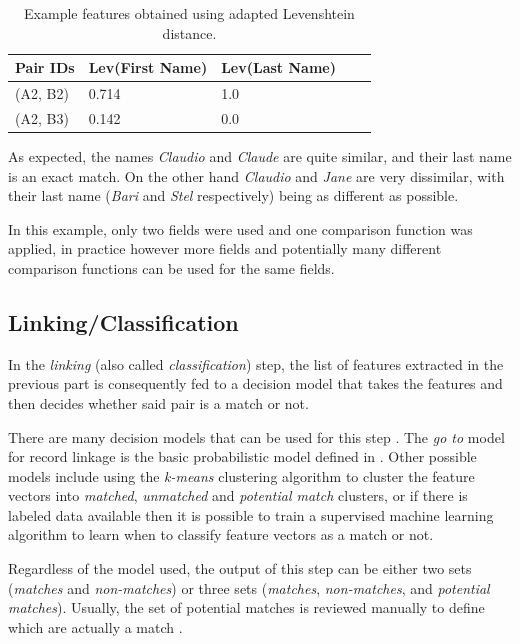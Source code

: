 \documentclass[epsfig,a4paper,11pt,titlepage,twoside,openany]{book}
\begin{document}
\begin{table}[H]
  \centering
  \begin{tabular}{l|l|l|l|l}
    Pair IDs & Lev(First Name) & Lev(Last Name) \\ \hline
    (A2, B2) & 0.714           & 1.0            \\
    (A2, B3) & 0.142           & 0.0           
  \end{tabular}
  \caption{Example features obtained using adapted Levenshtein distance.}
  \label{tab:ex-feature-levens}
\end{table}

As expected, the names \textit{Claudio} and \textit{Claude} are quite similar,
and their last name is an exact match. On the other hand \textit{Claudio} and
\textit{Jane} are very dissimilar, with their last name (\textit{Bari} and
\textit{Stel} respectively) being as different as possible.

In this example, only two fields were used and one comparison function was applied, in practice
however more fields and potentially many different comparison
functions can be used for the same fields.


\subsection{Linking/Classification}
\label{sec:rl-workflow-linking}

In the \textit{linking} (also called \textit{classification}) step, the list of features extracted in the previous part is consequently fed to a decision model that takes the features and then decides whether said pair is a match or not.

There are many decision models that can be used for this step \cite{gu06_decis_model_recor_linkag}.
The \textit{go to} model for record linkage is the basic probabilistic model defined in
\cite{fellegi69_theor_recor_linkag}. Other possible models \cite{Elfeky_tailor} include using the \textit{k-means} \cite{Hartigan1979} clustering algorithm to cluster the feature vectors into \textit{matched}, \textit{unmatched} and \textit{potential match} clusters, or if there is labeled data available then it is possible to train a supervised machine learning algorithm to learn when to classify
feature vectors as a match or not.

Regardless of the model used, the output of this step can be either two sets (\textit{matches} and \textit{non-matches}) or three sets (\textit{matches}, \textit{non-matches}, and \textit{potential matches}). Usually, the set of potential matches is reviewed manually to define which are actually a match \cite{dusetzina_m_2014}.
\end{document}
